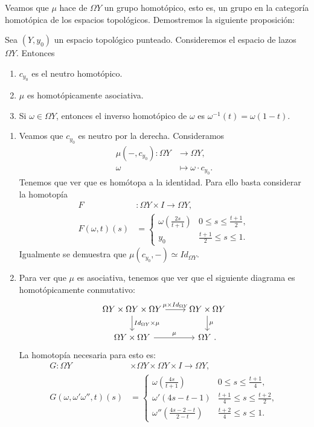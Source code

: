 Veamos que $\mu$ hace de $\Omega Y$ un grupo homotópico, esto es, un grupo en la categoría homotópica de los espacios topológicos. Demostremos la siguiente proposición:
\begin{prop}
Sea $(Y, y_0)$ un espacio topológico punteado. Consideremos el espacio de lazos $\Omega Y$. Entonces
\begin{enumerate}
\item $c_{y_0}$ es el neutro homotópico.
\item $\mu$ es homotópicamente asociativa.
\item Si $\omega \in \Omega Y$, entonces el inverso homotópico de $\omega$ es $\omega^{-1}(t) = \omega(1 - t)$.
\end{enumerate}
\end{prop}
\begin{demo}
\begin{enumerate}
\item Veamos que $c_{y_0}$ es neutro por la derecha. Consideramos
\begin{align*}
\mu(-,c_{y_0}) : \Omega Y &\longrightarrow \Omega Y, \\
\omega &\longmapsto \omega \cdotp c_{y_0}.
\end{align*}
Tenemos que ver que es homótopa a la identidad. Para ello basta considerar la homotopía
\begin{align*}
F&: \Omega Y \times I \longrightarrow \Omega Y, \\
F(\omega, t)(s) &= 
\begin{cases}
\omega\left(\frac{2s}{t+1}\right) & 0 \leq s \leq \frac{t+1}{2}, \\
y_0													& \frac{t+1}{2} \leq s \leq 1.
\end{cases}
\end{align*}
Igualmente se demuestra que $\mu(c_{y_0}, -) \simeq Id_{\Omega Y}$.
\item Para ver que $\mu$ es asociativa, tenemos que ver que el siguiente diagrama es homotópicamente conmutativo: 
\[
\begin{tikzcd}
	\Omega Y \times \Omega Y \times \Omega Y \rar{\mu \times Id_{\Omega Y}} \dar{Id_{\Omega Y} \times \mu}
		  & \Omega Y \times \Omega Y \dar{\mu} \\
	\Omega Y \times \Omega Y \rar{\mu} 
		  & \Omega Y \ .
\end{tikzcd}
\]
La homotopía necesaria para esto es:
\begin{align*}
G: 	\Omega Y &\times \Omega Y \times \Omega Y \times I \longrightarrow \Omega Y, \\
G(\omega, \omega' \omega'', t)(s) &= 
\begin{cases}
\omega \left( \frac{4s}{t+1}\right) & 0 \leq s \leq \frac{t+1}{4}, \\
\omega'(4s - t - 1)         		 & \frac{t+1}{4} \leq s \leq \frac{t+2}{2}, \\
\omega''\left( \frac{4s -2 - t}{2-t}\right) & \frac{t+2}{4} \leq s \leq 1.
\end{cases}
\end{align*}


\end{enumerate}
\end{demo}
